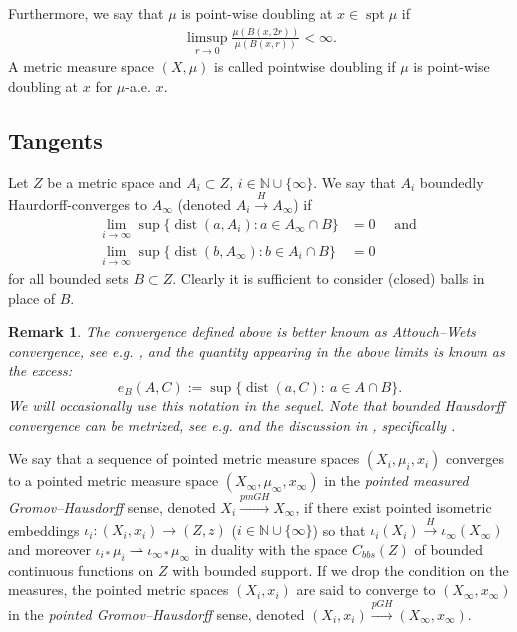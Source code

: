 \documentclass{amsart}
\newtheorem{remark}[theorem]{Remark}
\numberwithin{equation}{section}
\newcommand{\N}{\mathbb{N}}
\newcommand{\dist}{\operatorname{dist}}
\begin{document}
Furthermore, we say that $\mu$ is point-wise doubling at $x\in \operatorname{spt}\mu$ if
\begin{align*}
    \limsup_{r\to 0}\frac{\mu(B(x,2r))}{\mu(B(x,r))}<\infty.
\end{align*}
A metric measure space $(X,\mu)$ is called pointwise doubling if $\mu$ is point-wise doubling at $x$ for $\mu$-a.e. $x$.



\subsection{Tangents}

Let $Z$ be a metric space and $A_i\subset Z$, $i\in\N\cup\{\infty\}$. We say that $A_i$ boundedly Haurdorff-converges to $A_\infty$ (denoted $A_i\stackrel{H}{\longrightarrow} A_\infty$) if
\begin{align*}
    \lim_{i\to\infty}\sup\{\dist(a,A_i): a\in A_\infty\cap B\}&=0\quad\textrm{ and } \\
     \lim_{i\to\infty}\sup\{\dist(b,A_\infty): b\in A_i\cap B\}&=0
\end{align*}
for all bounded sets $B\subset Z$. Clearly it is sufficient to consider (closed) balls in place of $B$. 
\begin{remark}
The convergence defined above is better known as Attouch--Wets convergence, see e.g. \cite{attwets}, and the quantity appearing in the above limits is known as the excess:
\begin{equation}\label{eq:excess}
e_B(A,C):=\sup\{\dist(a,C):\ a\in A\cap B\}.
\end{equation}
We will occasionally use this notation in the sequel. Note that bounded Hausdorff convergence can be metrized, see e.g. \cite[Definition 2.15]{Bate22} and the discussion in \cite[Section 3]{Badger-Krandel-Vellis26}, specifically \cite[Lemma 3.1]{Badger-Krandel-Vellis26}.
\end{remark}
We say that a sequence of pointed metric measure spaces $(X_i,\mu_i, x_i)$ converges to a pointed metric measure space $(X_\infty,\mu_\infty,x_\infty)$ in the \emph{pointed measured Gromov--Hausdorff} sense, denoted $X_i\stackrel{pmGH}{\longrightarrow}X_\infty$, if there exist pointed isometric embeddings $\iota_i:(X_i,x_i)\to (Z,z)$ ($i\in\N\cup\{\infty\}$) so that $\iota_i(X_i)\stackrel{H}{\longrightarrow}\iota_\infty(X_\infty)$ and moreover $\iota_{i\ast}\mu_i\rightharpoonup \iota_{\infty\ast}\mu_\infty$ in duality with the space $C_{bbs}(Z)$ of bounded continuous functions on $Z$ with bounded support. If we drop the condition on the measures, the pointed metric spaces $(X_i,x_i)$ are said to converge to $(X_\infty,x_\infty)$ in the \emph{pointed Gromov--Hausdorff} sense, denoted $(X_i,x_i)\stackrel{pGH}{\longrightarrow}(X_\infty,x_\infty)$. 
\end{document}
